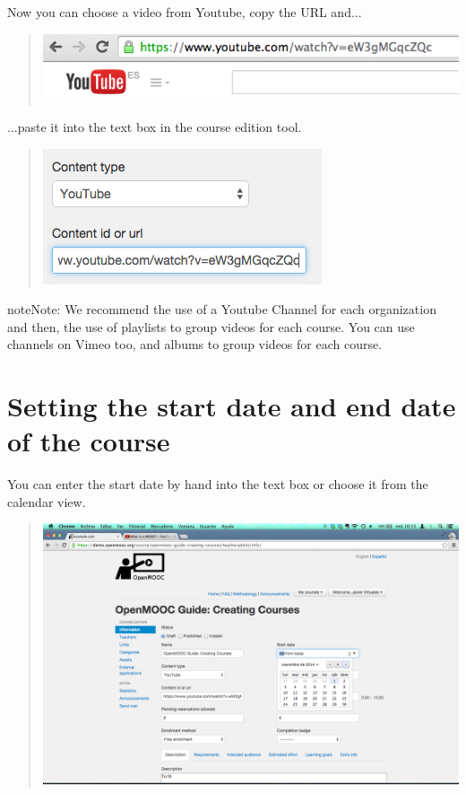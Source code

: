 \documentclass[letterpaper,10pt,english]{sphinxmanual}
\begin{document}
Now you can choose a video from Youtube, copy the URL and...
\begin{quote}

\includegraphics{2_course_information-2b.png}
\end{quote}

...paste it into the text box in the course edition tool.
\begin{quote}

\includegraphics{2_course_information-2c.png}
\end{quote}

\begin{notice}{note}{Note:}
We recommend the use of a Youtube Channel for each organization and then,
the use of playlists to group videos for each course. You can use channels on Vimeo too,
and albums to group videos for each course.
\end{notice}


\section{Setting the start date and end date of the course}
\label{course_page:setting-the-start-date-and-end-date-of-the-course}
You can enter the start date by hand into the text box or choose it from the calendar view.
\begin{quote}

\includegraphics{2_course_information-3.png}
\end{quote}
\end{document}
